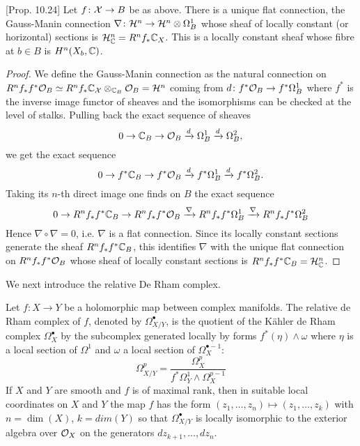 \documentclass[../main.tex]{subfiles}
\begin{document}
\begin{proposition} \textup{\cite{PS08}[Prop. 10.24]}
    Let $f \colon \mathcal{X} \to B$ be as above. There is a unique flat connection, the Gauss-Manin connection $\nabla\colon \mathcal{H}^n \to \mathcal{H}^n \otimes \Omega_B^1$ whose sheaf of locally constant  (or horizontal) sections is $\mathcal{H}^n_{\mathbb{C}} = R^n f_* \mathbb{C}_X$. This is a locally constant sheaf whose fibre at $b \in B$ is $H^n(X_b, \mathbb{C})$.
\end{proposition}
\begin{proof}
We define the Gauss-Manin connection as the natural connection on $R^n f_* f^* \mathcal{O}_B \simeq R^n f_* \mathbb{C}_{\mathcal{X}} \otimes_{\mathbb{C}_B} \mathcal{O}_B = \mathcal{H}^n$ coming from $d \colon f^*\mathcal{O}_B \to f^*\Omega^1_B$ where $f^*$ is the inverse image functor of sheaves and the isomorphisms can be checked at the level of stalks.
Pulling back the exact sequence of sheaves
\[
0 \to \mathbb{C}_B \to \mathcal{O}_B \xrightarrow{d} \Omega^1_B\xrightarrow{d} \Omega^2_B,
\]
we get the exact sequence
\[
0 \to f^*\mathbb{C}_B \to f^*\mathcal{O}_B \xrightarrow{d} f^*\Omega^1_B\xrightarrow{d} f^*\Omega^2_B.
\]
Taking its $n$-th direct image one finds on $B$ the exact sequence
\[
0 \to R^n f_*f^* \mathbb{C}_B \to R^n f_*f^*\mathcal{O}_B \xrightarrow{\nabla} R^n f_*f^*\Omega^1_B\xrightarrow{\nabla} R^n f_*f^*\Omega^2_B
\]
Hence $\nabla \circ \nabla=0$, i.e. $\nabla$ is a flat
connection. Since its locally constant sections generate the sheaf $R^n f_*f^* \mathbb{C}_B$, this identifies $\nabla$ with the unique flat connection on $R^n f_*f^*\mathcal{O}_B$ whose sheaf
of locally constant sections is $R^n f_*f^* \mathbb{C}_B =  \mathcal{H}^n_{\mathbb{C}}$.
\end{proof}

We next introduce the relative De Rham complex.
\begin{defn}
    Let $f \colon X \to Y$ be a holomorphic map between complex
manifolds. The relative de Rham complex of $f$, denoted by $\Omega^\bullet_{X/Y}$, is the quotient of the K\"ahler de Rham complex $\Omega^\bullet_X$ by the subcomplex generated locally by forms $f^*(\eta) \wedge \omega$ where $\eta$ is a local section of $\Omega^1$ and $\omega$ a local section of $\Omega^{\bullet-1}_X$:
\[
\Omega^p_{X/Y} = \frac{ \Omega^p_X}{f^*\Omega^1_Y \wedge \Omega^{p-1}_X}
\]
If $X$ and $Y$ are smooth and $f$ is of maximal rank, then in suitable local coordinates on $X$ and $Y$ the map $f$
has the form $(z_1, \dots ,z_n) \mapsto (z_1, \dots ,z_k)$ with $n = \dim(X)$, $k = dim(Y)$ so that $\Omega^\bullet_{X/Y}$ is locally isomorphic to the exterior algebra over $\mathcal{O}_X$ on the generators $dz_{k+1},\dots ,dz_n$.
\end{defn} 
\end{document}
